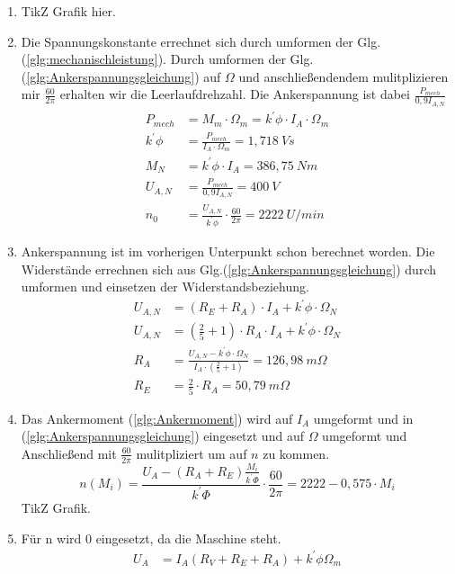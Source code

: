 \begin{solution}
\begin{enumerate}
\item TikZ Grafik hier.
\item Die Spannungskonstante errechnet sich durch umformen der Glg.(\ref{glg:mechanischleistung}). Durch umformen der Glg.(\ref{glg:Ankerspannungsgleichung}) auf $\Omega$ und anschließendendem mulitplizieren mir $\frac{60}{2 \pi}$ erhalten wir die Leerlaufdrehzahl. Die Ankerspannung ist dabei $\frac{P_{mech}}{0,9 I_{A,N}}$
\begin{align}
P_{mech} &=M_m \cdot \Omega_m = k^{'} \phi \cdot I_A \cdot \Omega_m\\
k^{'} \phi &= \frac{P_{mech}}{I_A \cdot \Omega_m} =1,718~Vs\\
M_N &= k^{'} \phi \cdot I_A = 386,75~Nm\\
U_{A,N} &= \frac{P_{mech}}{0,9 I_{A,N}} =400~V\\
n_0 &= \frac{U_{A,N}}{k^{'} \phi} \cdot \frac{60}{2\pi} =2222~U/min
\end{align}
\item Ankerspannung ist im vorherigen Unterpunkt schon berechnet worden. Die Widerst\"ande errechnen sich aus Glg.(\ref{glg:Ankerspannungsgleichung}) durch umformen und einsetzen der Widerstandsbeziehung.
\begin{align}
U_{A,N} &= (R_E + R_A) \cdot I_A +  k^{'} \phi \cdot \Omega_N\\
U_{A,N} &= \left (\frac{2}{5} + 1 \right ) \cdot R_A \cdot I_A +  k^{'} \phi \cdot \Omega_N\\
R_A &= \frac{U_{A,N}-k^{'} \phi \cdot \Omega_N}{I_A \cdot \left (\frac{2}{5} + 1 \right )}=126,98~m\Omega\\
R_E &= \frac{2}{5} \cdot R_A= 50,79~m\Omega
\end{align}
\item Das Ankermoment (\ref{glg:Ankermoment}) wird auf $I_A$ umgeformt und in (\ref{glg:Ankerspannungsgleichung}) eingesetzt und auf $\Omega$ umgeformt und Anschließend mit $\frac{60}{2 \pi}$ mulitpliziert um auf $n$ zu kommen.
\begin{equation}
n(M_i) = \frac{U_A - (R_A+R_E) \frac{ M_i}{k^{'} \Phi}}{k^{'}\Phi} \cdot \frac{60}{2 \pi} =2222-0,575 \cdot M_i
\end{equation}
TikZ Grafik.\\
\item Für n wird $0$ eingesetzt, da die Maschine steht.
\begin{align}
	U_A &= I_A ( R_V +R_E +R_A) +k^{'} \phi \Omega_m\\

\end{align}
\end{enumerate}
\end{solution}

